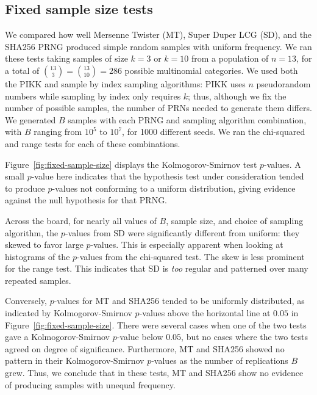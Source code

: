 \documentclass[12pt]{article}
\begin{document}
\subsection{Fixed sample size tests}
We compared how well Mersenne Twister (MT), Super Duper LCG (SD), and the SHA256 PRNG produced simple random samples with uniform frequency.
We ran these tests taking samples of size $k=3$ or $k=10$ from a population of $n=13$, for a total of ${13 \choose 3} = {13 \choose 10} = 286$ possible multinomial categories. 
We used both the PIKK and sample by index sampling algorithms:
PIKK uses $n$ pseudorandom numbers while sampling by index only requires $k$;
thus, although we fix the number of possible samples, the number of PRNs needed to generate them differs. 
We generated $B$ samples with each PRNG and sampling algorithm combination, with $B$ ranging from $10^5$ to $10^7$, for 1000 different seeds.
We ran the chi-squared and range tests for each of these combinations.

Figure~\ref{fig:fixed-sample-size} displays the Kolmogorov-Smirnov test $p$-values.
A small $p$-value here indicates that the hypothesis test under consideration tended to produce $p$-values not conforming to a uniform distribution, giving evidence against the null hypothesis for that PRNG.

Across the board, for nearly all values of $B$, sample size, and choice of sampling algorithm, the $p$-values from SD were significantly different from uniform: they skewed to favor large $p$-values. 
This is especially apparent when looking at histograms of the $p$-values from the chi-squared test. 
The skew is less prominent for the range test.
This indicates that SD is \textit{too} regular and patterned over many repeated samples.

Conversely, $p$-values for MT and SHA256 tended to be uniformly distributed, as indicated by Kolmogorov-Smirnov $p$-values above the horizontal line at $0.05$ in Figure~\ref{fig:fixed-sample-size}.
There were several cases when one of the two tests gave a Kolmogorov-Smirnov $p$-value below $0.05$, but no cases where the two tests agreed on degree of significance.
Furthermore, MT and SHA256 showed no pattern in their Kolmogorov-Smirnov $p$-values as the number of replications $B$ grew.
Thus, we conclude that in these tests, MT and SHA256 show no evidence of producing samples with unequal frequency.
\end{document}
